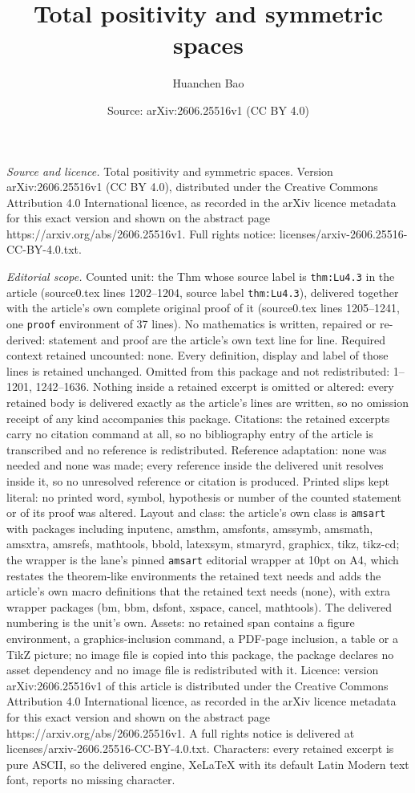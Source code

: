 \documentclass[10pt,a4paper]{amsart}
\title[Total positivity and symmetric spaces]{Total positivity and symmetric spaces}
\author{Huanchen Bao}
\date{Source: arXiv:2606.25516v1 (CC BY 4.0)}
\begin{document}
\maketitle

\noindent\emph{Source and licence.} Total positivity and symmetric spaces. Version arXiv:2606.25516v1 (CC BY 4.0), distributed under the Creative Commons Attribution 4.0 International licence, as recorded in the arXiv licence metadata for this exact version and shown on the abstract page https://arxiv.org/abs/2606.25516v1. Full rights notice: licenses/arxiv-2606.25516-CC-BY-4.0.txt.\par\smallskip

\noindent\textit{Editorial scope.} Counted unit: the Thm whose source label is \texttt{thm:Lu4.3} in the article (source0.tex lines 1202--1204, source label \texttt{thm:Lu4.3}), delivered together with the article's own complete original proof of it (source0.tex lines 1205--1241, one \texttt{proof} environment of 37 lines). No mathematics is written, repaired or re-derived: statement and proof are the article's own text line for line. Required context retained uncounted: none. Every definition, display and label of those lines is retained unchanged. Omitted from this package and not redistributed: 1--1201, 1242--1636. Nothing inside a retained excerpt is omitted or altered: every retained body is delivered exactly as the article's lines are written, so no omission receipt of any kind accompanies this package. Citations: the retained excerpts carry no citation command at all, so no bibliography entry of the article is transcribed and no reference is redistributed. Reference adaptation: none was needed and none was made; every reference inside the delivered unit resolves inside it, so no unresolved reference or citation is produced. Printed slips kept literal: no printed word, symbol, hypothesis or number of the counted statement or of its proof was altered. Layout and class: the article's own class is \texttt{amsart} with packages including inputenc, amsthm, amsfonts, amssymb, amsmath, amsxtra, amsrefs, mathtools, bbold, latexsym, stmaryrd, graphicx, tikz, tikz-cd; the wrapper is the lane's pinned \texttt{amsart} editorial wrapper at 10pt on A4, which restates the theorem-like environments the retained text needs and adds the article's own macro definitions that the retained text needs (none), with extra wrapper packages (bm, bbm, dsfont, xspace, cancel, mathtools). The delivered numbering is the unit's own. Assets: no retained span contains a figure environment, a graphics-inclusion command, a PDF-page inclusion, a table or a TikZ picture; no image file is copied into this package, the package declares no asset dependency and no image file is redistributed with it. Licence: version arXiv:2606.25516v1 of this article is distributed under the Creative Commons Attribution 4.0 International licence, as recorded in the arXiv licence metadata for this exact version and shown on the abstract page https://arxiv.org/abs/2606.25516v1. A full rights notice is delivered at licenses/arxiv-2606.25516-CC-BY-4.0.txt. Characters: every retained excerpt is pure ASCII, so the delivered engine, XeLaTeX with its default Latin Modern text font, reports no missing character.
\end{document}
